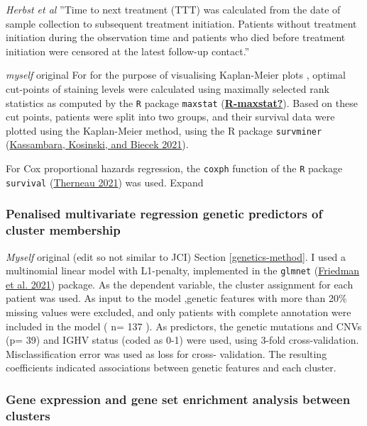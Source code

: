 \documentclass[11pt, a4paper, twosided]{book}
\begin{document}
\emph{Herbst et al}
''Time to next treatment (TTT) was calculated from the date of sample collection to subsequent
treatment initiation. Patients without treatment initiation during the observation time and
patients who died before treatment initiation were censored at the latest follow-up contact.''

\emph{myself} original
For for the purpose of visualising Kaplan-Meier plots , optimal cut-points of staining levels were calculated using maximally selected rank statistics as computed by the \texttt{R} package \texttt{maxstat} (\protect\hyperlink{ref-R-maxstat}{\textbf{R-maxstat?}}). Based on these cut points, patients were split into two groups, and their survival data were plotted using the Kaplan-Meier method, using the R package \texttt{survminer} (\protect\hyperlink{ref-R-survminer}{Kassambara, Kosinski, and Biecek 2021}).

For Cox proportional hazards regression, the \texttt{coxph} function of the \texttt{R} package \texttt{survival} (\protect\hyperlink{ref-R-survival}{Therneau 2021}) was used. Expand

\hypertarget{cluster-genetics-method}{%
\subsubsection{Penalised multivariate regression genetic predictors of cluster membership}\label{cluster-genetics-method}}

\emph{Myself} original (edit so not similar to JCI)
Section \ref{genetics-method}. I used a multinomial linear model with L1-penalty, implemented in the \texttt{glmnet} (\protect\hyperlink{ref-R-glmnet}{Friedman et al. 2021}) package. As the dependent variable, the cluster assignment for each patient was used. As input to the model ,genetic features with more than 20\% missing values were excluded, and only patients with complete annotation were included in the model ( n= 137 ). As predictors, the genetic mutations and CNVs (p= 39) and IGHV status (coded as 0-1) were used, using 3-fold cross-validation. Misclassification error was used as loss for cross- validation. The resulting coefficients indicated associations between genetic features and each cluster.

\hypertarget{cluster-rna-method}{%
\subsubsection{Gene expression and gene set enrichment analysis between clusters}\label{cluster-rna-method}}
\end{document}
